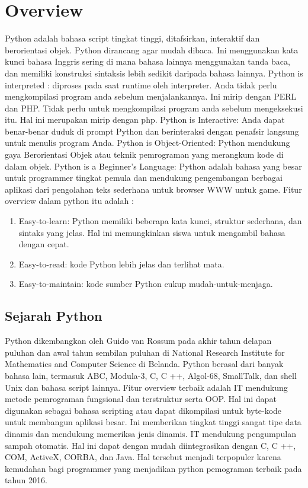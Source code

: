 \section{Overview}
Python adalah bahasa script tingkat tinggi, ditafsirkan, interaktif dan berorientasi objek. Python dirancang agar mudah dibaca. Ini menggunakan kata kunci bahasa Inggris sering di mana bahasa lainnya menggunakan tanda baca, dan memiliki konstruksi sintaksis lebih sedikit daripada bahasa lainnya.
Python is interpreted : diproses pada saat runtime oleh interpreter. Anda tidak perlu mengkompilasi program anda sebelum menjalankannya. Ini mirip dengan PERL dan PHP.
Tidak perlu untuk mengkompilasi program anda sebelum mengeksekusi itu. Hal ini merupakan mirip dengan php.
Python is Interactive: Anda dapat benar-benar duduk di prompt Python dan berinteraksi dengan penafsir langsung untuk menulis program Anda.
Python is Object-Oriented: Python mendukung gaya Berorientasi Objek atau teknik pemrograman yang merangkum kode di dalam objek.
Python is a Beginner's Language: Python adalah bahasa yang besar untuk programmer tingkat pemula dan mendukung pengembangan berbagai aplikasi dari pengolahan teks sederhana untuk browser WWW untuk game.
Fitur overview dalam python itu adalah :
\begin {enumerate}
\item Easy-to-learn: Python memiliki beberapa kata kunci, struktur sederhana, dan sintaks yang jelas. Hal ini memungkinkan siswa untuk mengambil bahasa dengan cepat.
\item Easy-to-read: kode Python lebih jelas dan terlihat mata.
\item Easy-to-maintain: kode sumber Python cukup mudah-untuk-menjaga.
\end {enumerate}

\subsection{Sejarah Python}
Python dikembangkan oleh Guido van Rossum pada akhir tahun delapan puluhan dan awal tahun sembilan puluhan di National Research Institute for Mathematics and Computer Science di Belanda. Python berasal dari banyak bahasa lain, termasuk ABC, Modula-3, C, C ++, Algol-68, SmallTalk, dan shell Unix dan bahasa script lainnya.
Fitur overview terbaik adalah IT mendukung metode pemrograman fungsional dan terstruktur serta OOP. Hal ini dapat digunakan sebagai bahasa scripting atau dapat dikompilasi untuk byte-kode untuk membangun aplikasi besar. Ini memberikan tingkat tinggi sangat tipe data dinamis dan mendukung memeriksa jenis dinamis. IT mendukung pengumpulan sampah otomatis. Hal ini dapat dengan mudah diintegrasikan dengan C, C ++, COM, ActiveX, CORBA, dan Java. Hal tersebut menjadi terpopuler karena kemudahan bagi programmer yang menjadikan python pemograman terbaik pada tahun 2016.

